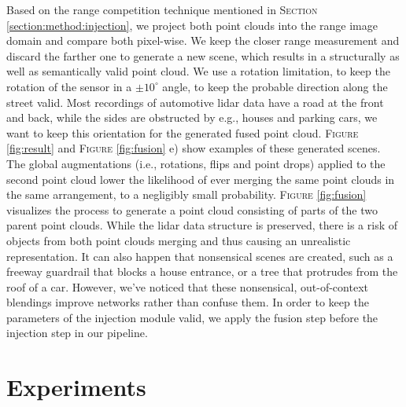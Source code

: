 \documentclass[letterpaper, 10 pt, conference]{ieeeconf}
\begin{document}
Based on the range competition technique mentioned in \textsc{Section} \ref{section:method:injection}, we project both point clouds into the range image domain and compare both pixel-wise. We keep the closer range measurement and discard the farther one to generate a new scene, which results in a structurally as well as semantically valid point cloud.
We use a rotation limitation, to keep the rotation of the sensor in a $\pm 10^\circ$ angle, to keep the probable direction along the street valid. Most recordings of automotive lidar data have a road at the front and back, while the sides are obstructed by e.g., houses and parking cars, we want to keep this orientation for the generated fused point cloud. \textsc{Figure} \ref{fig:result}  and \textsc{Figure} \ref{fig:fusion} e) show examples of these generated scenes. The global augmentations (i.e., rotations, flips and point drops) applied to the second point cloud lower the likelihood of ever merging the same point clouds in the same arrangement, to a negligibly small probability. \textsc{Figure} \ref{fig:fusion} visualizes the process to generate a point cloud consisting of parts of the two parent point clouds. While the lidar data structure is preserved, there is a risk of objects from both point clouds merging and thus causing an unrealistic representation. It can also happen that nonsensical scenes are created, such as a freeway guardrail that blocks a house entrance, or a tree that protrudes from the roof of a car. However, we've noticed that these nonsensical, out-of-context blendings improve networks rather than confuse them.
In order to keep the parameters of the injection module valid, we apply the fusion step before the injection step in our pipeline.



\section{Experiments}
\label{section:experiments}
\end{document}

